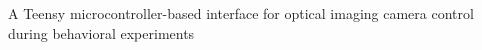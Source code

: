 A Teensy microcontroller-based interface for optical imaging camera control during behavioral experiments
